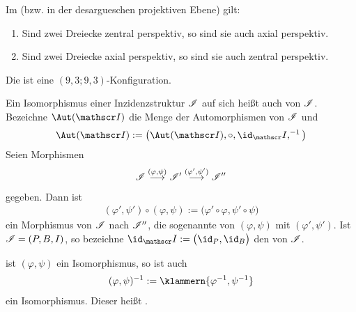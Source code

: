 \begin{theorem}\enter
	Im  (bzw. in der desargueschen projektiven Ebene) gilt:
	\begin{enumerate}
		\item Sind zwei Dreiecke zentral perspektiv, so sind sie auch axial perspektiv.
		\item Sind zwei Dreiecke axial perspektiv, so sind sie auch zentral perspektiv.
	\end{enumerate}
\end{theorem}

\begin{beispiel}\enter
	Die  ist eine $(9,3;9,3)$-Konfiguration.
\end{beispiel}

\begin{definition}
	Ein Isomorphismus einer Inzidenzstruktur $\mathscr{I}$ auf sich heißt auch  von $\mathscr{I}$.
	Bezeichne $\Aut(\Inz)$ die Menge der Automorphismen von $\mathscr{I}$ und
	\begin{align*}
		\Aut(\Inz):=\big(\Aut(\Inz),\circ,\id_\Inz,^{-1}\big)
	\end{align*}
	Seien Morphismen
	\begin{align*}
		\mathscr{I}\overset{(\varphi,\psi)}{\longrightarrow}\mathscr{I}'\overset{(\varphi',\psi')}{\longrightarrow}\mathscr{I}''
	\end{align*}		
	gegeben. Dann ist
	\begin{align*}
		(\varphi',\psi')\circ(\varphi,\psi):=\big(\varphi'\circ\varphi,\psi'\circ\psi\big)
	\end{align*}
	ein Morphismus von $\mathscr{I}$ nach $\mathscr{I}''$, die sogenannte   von $(\varphi,\psi)$ mit $(\varphi',\psi')$.
	\nl
	Ist $\mathscr{I}=(P,B,I)$, so bezeichne $\id_\Inz:=\big(\id_P,\id_B\big)$ den  von $\mathscr{I}$.
\end{definition}

\begin{lemma}
	ist $(\varphi,\psi)$ ein Isomorphismus, so ist auch 
	\begin{align*}
		(\varphi,\psi)^{-1}:=\klammern{\varphi^{-1},\psi^{-1}}
	\end{align*}
	ein Isomorphismus.
	Dieser heißt .
\end{lemma}

